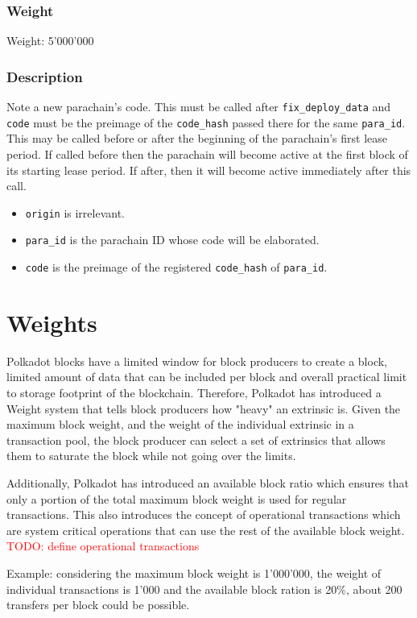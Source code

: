 \documentclass[11pt,a4paper]{article}
\newcommand{\todo}[1]{\textcolor{red}{TODO: #1}}
\begin{document}
\subsubsection*{Weight}
Weight: 5'000'000
\subsubsection*{Description}
Note a new parachain's code. This must be called after \verb|fix_deploy_data| and \verb|code| must be the preimage of the \verb|code_hash| passed there for the same \verb|para_id|. This may be called before or after the beginning of the parachain's first lease period. If called before then the parachain will become active at the first block of its starting lease period. If after, then it will become active immediately after this call.

\begin{itemize}
\item \verb|origin| is irrelevant.
\item \verb|para_id| is the parachain ID whose code will be elaborated.
\item \verb|code| is the preimage of the registered \verb|code_hash| of \verb|para_id|.
\end{itemize}

\section{Weights}
Polkadot blocks have a limited window for block producers to create a block,
limited amount of data that can be included per block and overall practical limit
to storage footprint of the blockchain. Therefore, Polkadot has introduced a Weight
system that tells block producers how "heavy" an extrinsic is. Given the maximum
block weight, and the weight of the individual extrinsic in a transaction pool,
the block producer can select a set of extrinsics that allows them to saturate the
block while not going over the limits.
\newline

Additionally, Polkadot has introduced an available block ratio which ensures that
only a portion of the total maximum block weight is used for regular transactions.
This also introduces the concept of operational transactions which are system
critical operations that can use the rest of the available block weight.
\todo{define operational transactions}
\newline

Example: considering the maximum block weight is 1'000'000, the weight of
individual transactions is 1'000 and the available block ration is 20\%,
about 200 transfers per block could be possible.
\end{document}
